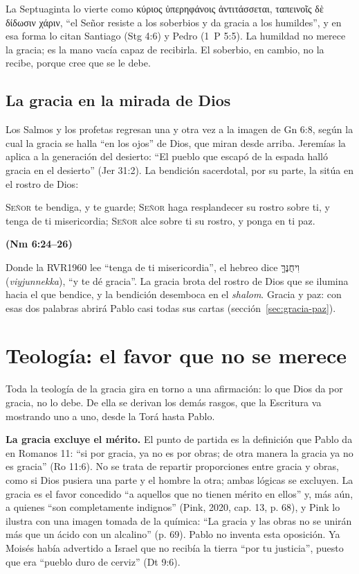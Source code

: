 \documentclass[11pt,letterpaper]{article}
\newcommand{\heb}[1]{\mbox{\foreignlanguage{hebrew}{#1}}}
\newcommand{\grc}[1]{\foreignlanguage{ancientgreek}{#1}}
\newcommand{\hebverso}[1]{\par\smallskip{\centering\begin{otherlanguage}{hebrew}\large #1\end{otherlanguage}\par}\smallskip}
\newcommand{\SENOR}{\textsc{Señor}}
\newcommand{\fuente}[1]{\par\hfill{\upshape\bfseries\small\textcolor{azul}{#1}}}
\begin{document}
La Septuaginta lo vierte como \grc{κύριος ὑπερηφάνοις ἀντιτάσσεται, ταπεινοῖς δὲ δίδωσιν χάριν}, ``el Señor resiste a los soberbios y da gracia a los humildes'', y en esa forma lo citan Santiago (Stg 4:6) y Pedro (1~P 5:5). La humildad no merece la gracia; es la mano vacía capaz de recibirla. El soberbio, en cambio, no la recibe, porque cree que se le debe.


\subsection{La gracia en la mirada de Dios}
Los Salmos y los profetas regresan una y otra vez a la imagen de Gn 6:8, según la cual la gracia se halla ``en los ojos'' de Dios, que miran desde arriba. Jeremías la aplica a la generación del desierto: ``El pueblo que escapó de la espada halló gracia en el desierto'' (Jer 31:2). La bendición sacerdotal, por su parte, la sitúa en el rostro de Dios:

\hebverso{יָאֵר יְהוָה פָּנָיו אֵלֶיךָ וִיחֻנֶּךָּ}
\begin{cita}\SENOR{} te bendiga, y te guarde; \SENOR{} haga resplandecer su rostro sobre ti, y tenga de ti misericordia; \SENOR{} alce sobre ti su rostro, y ponga en ti paz.\fuente{(Nm 6:24--26)}\end{cita}

Donde la RVR1960 lee ``tenga de ti misericordia'', el hebreo dice \heb{וִיחֻנֶּךָּ} (\emph{viyjunnekka}), ``y te dé gracia''. La gracia brota del rostro de Dios que se ilumina hacia el que bendice, y la bendición desemboca en el \emph{shalom}. Gracia y paz: con esas dos palabras abrirá Pablo casi todas sus cartas (sección~\ref{sec:gracia-paz}).

\section{Teología: el favor que no se merece}\label{sec:teologia-gracia}

Toda la teología de la gracia gira en torno a una afirmación: lo que Dios da por gracia, no lo debe. De ella se derivan los demás rasgos, que la Escritura va mostrando uno a uno, desde la Torá hasta Pablo.

\textbf{La gracia excluye el mérito.} El punto de partida es la definición que Pablo da en Romanos 11: ``si por gracia, ya no es por obras; de otra manera la gracia ya no es gracia'' (Ro 11:6). No se trata de repartir proporciones entre gracia y obras, como si Dios pusiera una parte y el hombre la otra; ambas lógicas se excluyen. La gracia es el favor concedido ``a aquellos que no tienen mérito en ellos'' y, más aún, a quienes ``son completamente indignos'' (Pink, 2020, cap. 13, p. 68), y Pink lo ilustra con una imagen tomada de la química: ``La gracia y las obras no se unirán más que un ácido con un alcalino'' (p. 69). Pablo no inventa esta oposición. Ya Moisés había advertido a Israel que no recibía la tierra ``por tu justicia'', puesto que era ``pueblo duro de cerviz'' (Dt 9:6).
\end{document}
